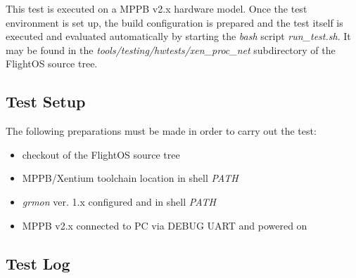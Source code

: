 This test is executed on a \gls{MPPB} v2.x hardware model. Once the test
environment is set up, the build configuration is prepared and the test itself
is executed and evaluated automatically by starting the \emph{bash} script
\emph{run\_test.sh}. It may be found in the 
\mbox{\emph{tools/testing/hwtests/xen\_proc\_net}} subdirectory of the FlightOS
source tree.


\subsection*{Test Setup}

The following preparations must be made in order to carry out the test:

\begin{itemize}
	\item checkout of the FlightOS source tree
	\item \gls{MPPB}/\gls{Xentium} toolchain location in shell \emph{PATH}
	\item \emph{grmon} ver. 1.x configured and in shell \emph{PATH}
	\item \gls{MPPB} v2.x connected to PC via DEBUG UART and powered on
\end{itemize}


\subsection*{Test Log}





